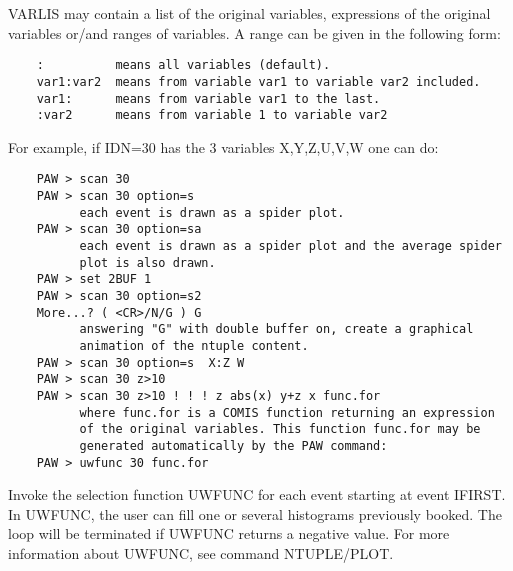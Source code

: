    \par
VARLIS may contain a list of the original variables, expressions of the 
   original variables or/and ranges of variables.  A range can be given in the 
   following form:  
\begin{verbatim}
    :          means all variables (default).
    var1:var2  means from variable var1 to variable var2 included.
    var1:      means from variable var1 to the last.
    :var2      means from variable 1 to variable var2
\end{verbatim}
\ENDVERB
   \par
For example, if IDN=30 has the 3 variables X,Y,Z,U,V,W one can do:  
\begin{verbatim}
    PAW > scan 30
    PAW > scan 30 option=s
          each event is drawn as a spider plot.
    PAW > scan 30 option=sa
          each event is drawn as a spider plot and the average spider
          plot is also drawn.
    PAW > set 2BUF 1
    PAW > scan 30 option=s2
    More...? ( <CR>/N/G ) G
          answering "G" with double buffer on, create a graphical
          animation of the ntuple content.
    PAW > scan 30 option=s  X:Z W
    PAW > scan 30 z>10
    PAW > scan 30 z>10 ! ! ! z abs(x) y+z x func.for
          where func.for is a COMIS function returning an expression
          of the original variables. This function func.for may be
          generated automatically by the PAW command:
    PAW > uwfunc 30 func.for
\end{verbatim}

\ENDCMD


\BEGARG
{}
\ENDARG

   \par
Invoke the selection function UWFUNC for each event starting at event 
   IFIRST.  In UWFUNC, the user can fill one or several histograms previously 
   booked.  The loop will be terminated if UWFUNC returns a negative value.  
   For more information about UWFUNC, see command NTUPLE/PLOT.  

\ENDCMD


\BEGARG
{}
\ENDARG

